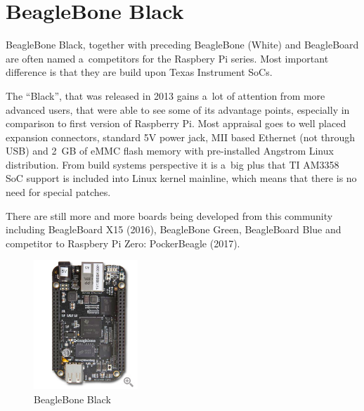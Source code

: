 \documentclass[printmode]{mgr}
\begin{document}




\section{BeagleBone Black}

BeagleBone Black, together with preceding BeagleBone (White) and BeagleBoard are often named a~competitors for the Raspbery Pi series.
Most important difference is that they are build upon Texas Instrument SoCs.

The ``Black'', that was released in 2013 gains a~lot of attention from more advanced users, that were able to see some of its advantage points, especially in comparison to first version of Raspberry Pi.
Most appraisal goes to well placed expansion connectors, standard 5V power jack, MII based Ethernet (not through USB) and 2~GB of eMMC flash memory with pre-installed Angstrom Linux distribution.
From build systems perspective it is a~big plus that TI AM3358 SoC support is included into Linux kernel mainline, which means that there is no need for special patches.

There are still more and more boards being developed from this community including BeagleBoard X15 (2016), BeagleBone Green, BeagleBoard Blue and competitor to Raspbery Pi Zero: PockerBeagle (2017).

\begin{figure}[htbp]
  \centering
    \includegraphics[width=0.35\textwidth,angle=-90,origin=c]{beaglebone-front.jpg}
  \caption{BeagleBone Black}
  \label{fig:devboard-beaglebone}
\end{figure}
\end{document}
